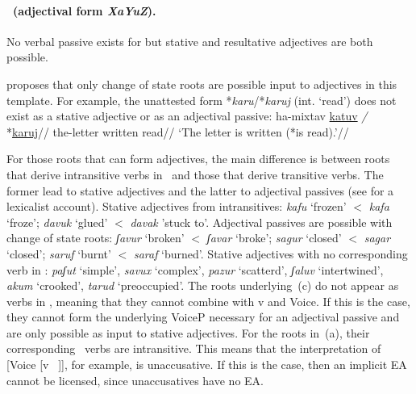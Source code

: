 

\paragraph*{\tkal~(adjectival form \emph{XaYuZ}).} No verbal passive exists for {\tkal} but stative and resultative adjectives are both possible.

\citep{doron00} proposes that only change of state roots are possible input to adjectives in this template. For example, the unattested form *\emph{karu}/*\emph{karuj} (int. `read') does not exist as a stative adjective or as an adjectival passive:
\ex
  \begingl
    \gla ha-mixtav \underline{katuv} \emph{/} *\underline{karuj}//
    \glb the-letter written {} read//
    \glft `The letter is written (*is read).'//
  \endgl
\xe

For those roots that can form adjectives, the main difference is between roots that derive intransitive verbs in \tkal~and those that derive transitive verbs. The former lead to stative adjectives and the latter to adjectival passives (see \citealt{meltzerasscher11} for a lexicalist account).
\pex 
  \a Stative adjectives from intransitives: \emph{kafu} `frozen' $<$ \emph{kafa} `froze'; \emph{davuk} `glued' $<$ \emph{davak} 'stuck to'. %
  \a Adjectival passives are possible with change of state roots: \emph{ʃavur} `broken' $<$ \emph{ʃavar} `broke'; \emph{sagur} `closed' $<$ \emph{sagar} `closed'; \emph{saruf} `burnt' $<$ \emph{saraf} `burned'. %
  \a Stative adjectives with no corresponding verb in \tkal: \emph{paʃut} `simple', \emph{savux} `complex', \emph{pazur} `scatterd', \emph{ʃaluv} `intertwined', \emph{akum} `crooked', \emph{tarud} `preoccupied'.
  \xe
The roots underlying~(\lastx c) do not appear as verbs in \tkal, meaning that they cannot combine with v and Voice. If this is the case, they cannot form the underlying VoiceP necessary for an adjectival passive and are only possible as input to stative adjectives. For the roots in~(\lastx a), their corresponding \tkal~verbs are intransitive. This means that the interpretation of [Voice [v ~\!]], for example, is unaccusative. If this is the case, then an implicit EA cannot be licensed, since unaccusatives have no EA.


